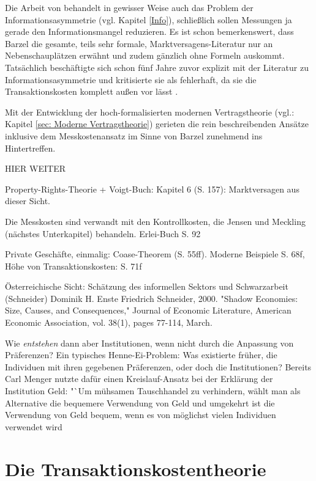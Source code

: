 Die Arbeit von \Textcite{Barzel1982} behandelt in gewisser Weise auch das Problem der Informationsasymmetrie (vgl. Kapitel \ref{Info}), schließlich sollen Messungen ja gerade den Informationsmangel reduzieren. Es ist schon bemerkenswert, dass Barzel die gesamte, teils sehr formale, Marktversagens-Literatur nur an Nebenschauplätzen erwähnt und zudem gänzlich ohne Formeln auskommt. Tatsächlich beschäftigte sich \textcite{Barzel1977} schon fünf Jahre zuvor explizit mit der Literatur zu Informationsasymmetrie und kritisierte sie als fehlerhaft, da sie die Transaktionskosten komplett außen vor lässt \parencite[S. 6]{Allen2024}. 

Mit der Entwicklung der hoch-formalisierten modernen Vertragstheorie (vgl.: Kapitel \ref{sec: Moderne Vertragstheorie}) gerieten die rein beschreibenden Ansätze inklusive dem Messkostenansatz im Sinne von Barzel zunehmend ins Hintertreffen. 



HIER WEITER


\parencite[S. 284]{Erlei2016}
Property-Rights-Theorie + Voigt-Buch: Kapitel 6 (S. 157): Marktversagen aus dieser Sicht.


Die Messkosten sind verwandt mit den Kontrollkosten, die Jensen und Meckling (nächstes Unterkapitel) behandeln.
Erlei-Buch S. 92


Private Geschäfte, einmalig: Coase-Theorem (S. 55ff). Moderne Beispiele S. 68f, Höhe von Transaktionskosten: S. 71f


Österreichische Sicht: Schätzung des informellen Sektors und Schwarzarbeit (Schneider)
Dominik H. Enste Friedrich Schneider, 2000. "Shadow Economies: Size, Causes, and Consequences," Journal of Economic Literature, American Economic Association, vol. 38(1), pages 77-114, March.



Wie \textit{entstehen} dann aber Institutionen, wenn nicht durch die Anpassung von Präferenzen? Ein typisches Henne-Ei-Problem: Was existierte früher, die Individuen mit ihren gegebenen Präferenzen, oder doch die Institutionen? Bereits Carl Menger nutzte dafür einen Kreislauf-Ansatz bei der Erklärung der Institution Geld: "`Um mühsamen Tauschhandel zu verhindern, wählt man als Alternative die bequemere Verwendung von Geld und umgekehrt ist die Verwendung von Geld bequem, wenn es von möglichst vielen Individuen verwendet wird \parencite[S.176]{Hodgson1998}



\section{Die Transaktionskostentheorie}
\label{sec: Transaktionskosten}

